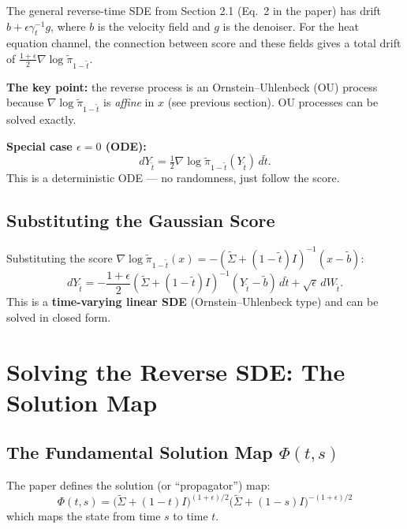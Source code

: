 \documentclass[11pt, a4paper]{article}
\theoremstyle{definition}
\begin{document}
\begin{calculation}[title={Where does this SDE come from?}]
The general reverse-time SDE from Section 2.1 (Eq.~2 in the paper) has drift $b + \epsilon \gamma_t^{-1} g$, where $b$ is the velocity field and $g$ is the denoiser. For the heat equation channel, the connection between score and these fields gives a total drift of $\frac{1+\epsilon}{2}\nabla\log\tilde{\pi}_{1-\tilde{t}}$.

\medskip
\textbf{The key point:} the reverse process is an Ornstein--Uhlenbeck (OU) process because $\nabla\log\tilde{\pi}_{1-\tilde{t}}$ is \emph{affine} in $x$ (see previous section). OU processes can be solved exactly.

\medskip
\textbf{Special case $\epsilon=0$ (ODE):}
\[
    dY_{\tilde{t}} = \tfrac{1}{2}\nabla\log\tilde{\pi}_{1-\tilde{t}}(Y_{\tilde{t}})\,d\tilde{t}.
\]
This is a deterministic ODE --- no randomness, just follow the score.
\end{calculation}

\subsection{Substituting the Gaussian Score}

Substituting the score $\nabla\log\tilde{\pi}_{1-\tilde{t}}(x) = -(\tilde{\Sigma}+(1-\tilde{t})I)^{-1}(x - \tilde{b})$:
\[
    dY_{\tilde{t}} = -\frac{1+\epsilon}{2}(\tilde{\Sigma}+(1-\tilde{t})I)^{-1}(Y_{\tilde{t}} - \tilde{b})\,d\tilde{t} + \sqrt{\epsilon}\,dW_{\tilde{t}}.
\]
This is a \textbf{time-varying linear SDE} (Ornstein--Uhlenbeck type) and can be solved in closed form.

\section{Solving the Reverse SDE: The Solution Map}

\subsection{The Fundamental Solution Map $\Phi(t,s)$}

The paper defines the solution (or ``propagator'') map:
\[
    \boxed{\;\Phi(t,s) = \bigl(\tilde{\Sigma}+(1-t)I\bigr)^{(1+\epsilon)/2} \bigl(\tilde{\Sigma}+(1-s)I\bigr)^{-(1+\epsilon)/2}\;}
\]
which maps the state from time $s$ to time $t$.
\end{document}
